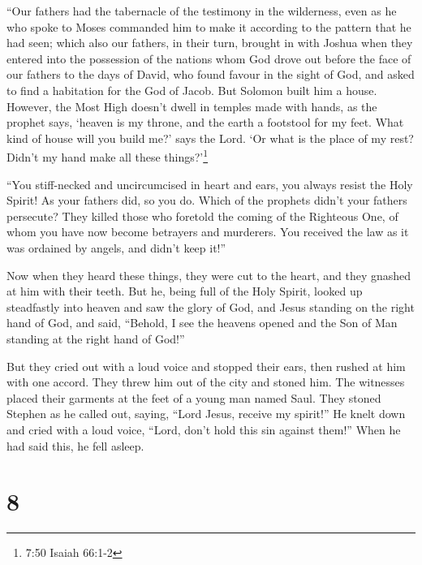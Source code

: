  ``Our fathers had the tabernacle of the testimony in the
wilderness, even as he who spoke to Moses commanded him to make it
according to the pattern that he had seen;  which also our
fathers, in their turn, brought in with Joshua when they entered into
the possession of the nations whom God drove out before the face of our
fathers to the days of David,  who found favour in the
sight of God, and asked to find a habitation for the God of Jacob.
 But Solomon built him a house.  However, the
Most High doesn't dwell in temples made with hands, as the prophet says,
 `heaven is my throne, and the earth a footstool for my
feet. What kind of house will you build me?' says the Lord. `Or what is
the place of my rest?  Didn't my hand make all these
things?'\footnote{7:50 Isaiah 66:1-2}

 ``You stiff-necked and uncircumcised in heart and ears,
you always resist the Holy Spirit! As your fathers did, so you do.
 Which of the prophets didn't your fathers persecute? They
killed those who foretold the coming of the Righteous One, of whom you
have now become betrayers and murderers.  You received the
law as it was ordained by angels, and didn't keep it!''

 Now when they heard these things, they were cut to the
heart, and they gnashed at him with their teeth.  But he,
being full of the Holy Spirit, looked up steadfastly into heaven and saw
the glory of God, and Jesus standing on the right hand of God,
 and said, ``Behold, I see the heavens opened and the Son
of Man standing at the right hand of God!''

 But they cried out with a loud voice and stopped their
ears, then rushed at him with one accord.  They threw him
out of the city and stoned him. The witnesses placed their garments at
the feet of a young man named Saul.  They stoned Stephen as
he called out, saying, ``Lord Jesus, receive my spirit!'' 
He knelt down and cried with a loud voice, ``Lord, don't hold this sin
against them!'' When he had said this, he fell asleep.

\hypertarget{section-7}{%
\section{8}\label{section-7}}

